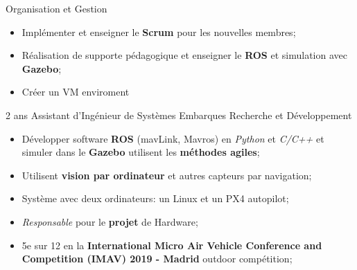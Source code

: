 
        {Organisation et Gestion}
        {\begin{itemize}
            \item Implémenter et enseigner le \textbf{Scrum} pour les nouvelles membres;
        \end{itemize}}
        {}{}{}
    

    {\begin{itemize}
        \item Réalisation de supporte pédagogique et enseigner le \textbf{ROS} et simulation avec \textbf{Gazebo};
\vspace{-5pt}        \item Créer un VM enviroment 
    \end{itemize}}{}{}{}


    \cvevent
    
    	{2 ans}
    	{Assistant d'Ingénieur de Systèmes Embarques}
    	{Recherche et Développement}
    	{\begin{itemize}
    	    \item Développer software \textbf{ROS} (mavLink, Mavros) en \textit{Python} et \textit{C/C++} et simuler dans le \textbf{Gazebo} utilisent les \textbf{méthodes agiles};
\vspace{-5pt}    	    \item Utilisent \textbf{vision par ordinateur} et autres capteurs par navigation;
\vspace{-5pt} \item Système avec deux ordinateurs: un Linux et un PX4 autopilot;
\vspace{-5pt} \item \textit{Responsable} pour le \textbf{projet} de Hardware;
    	\end{itemize}}
    	{}{}
    	{\begin{itemize}
    	    \item 5e sur 12 en la \textbf{International Micro Air Vehicle Conference and Competition (IMAV) 2019 - Madrid} outdoor compétition;
    	\end{itemize}}
